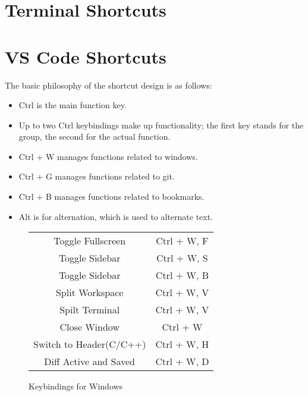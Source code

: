 \documentclass[10pt]{article}
\begin{document}
\section{Terminal Shortcuts} \label{S_Terminal}


\section{VS Code Shortcuts} \label{S_VSCode}
	The basic philosophy of the shortcut design is as follows:

	\begin{itemize}
		\item Ctrl is the main function key.
		\item Up to two Ctrl keybindings make up functionality; the first key stands for the group, the second for the actual function.
		\item Ctrl + W manages functions related to windows.
		\item Ctrl + G manages functions related to git.
		\item Ctrl + B manages functions related to bookmarks.
		\item Alt is for alternation, which is used to alternate text.
	\end{itemize}

	\begin{figure}[H]
		\centering
		\begin{tabular}{@{}c c@{}}
			\midrule

			Toggle Fullscreen & Ctrl + W, F \\
			Toggle Sidebar & Ctrl + W, S \\
			Toggle Sidebar & Ctrl + W, B \\
			Split Workspace & Ctrl + W, V \\
			Spilt Terminal & Ctrl + W, V \\
			Close Window & Ctrl + W \\
			Switch to Header(C/C++) & Ctrl + W, H \\
			Diff Active and Saved & Ctrl + W, D \\

			\bottomrule
		\end{tabular}
		\caption{Keybindings for Windows}
	\end{figure}
\end{document}
